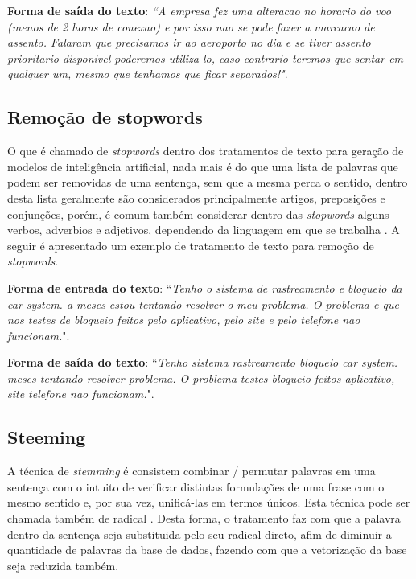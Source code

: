 \documentclass[12pt]{article}
\begin{document}
\textbf{Forma de saída do texto}: \emph{``A empresa fez uma alteracao no horario do voo (menos de 2 horas de conexao) e por isso nao se pode fazer a marcacao de assento. Falaram que precisamos ir ao aeroporto no dia e se tiver assento prioritario disponivel poderemos utiliza-lo, caso contrario teremos que sentar em qualquer um, mesmo que tenhamos que ficar separados!"}.

\subsection{Remoção de stopwords}\label{sec:stopwords}

O que é chamado de \emph{stopwords} dentro dos tratamentos de texto para geração de modelos de inteligência artificial, nada mais é do que uma lista de palavras que podem ser removidas de uma sentença, sem que a mesma perca o sentido, dentro desta lista geralmente são considerados principalmente artigos, preposições e conjunções, porém, é comum também considerar dentro das \emph{stopwords} alguns verbos, adverbios e adjetivos, dependendo da linguagem em que se trabalha \cite{mendez:06}. A seguir é apresentado um exemplo de tratamento de texto para remoção de \textit{stopwords}.

\textbf{Forma de entrada do texto}: ``\emph{Tenho o sistema de rastreamento e bloqueio da car system. a meses estou tentando resolver o meu problema. O problema e que nos testes de bloqueio feitos pelo aplicativo, pelo site e pelo telefone nao funcionam.}". 

\textbf{Forma de saída do texto}: ``\emph{Tenho sistema rastreamento bloqueio car system. meses tentando resolver problema. O problema testes bloqueio feitos aplicativo, site telefone nao funcionam.}".

\subsection{Steeming}\label{sec:steeming}

A técnica de \emph{stemming} é consistem combinar / permutar palavras em uma sentença com o intuito de verificar distintas formulações de uma frase com o mesmo sentido e, por sua vez, unificá-las em termos únicos. Esta técnica pode ser chamada também de radical \cite{dias:06}. Desta forma, o tratamento faz com que a palavra dentro da sentença seja substituida pelo seu radical direto, afim de diminuir a quantidade de palavras da base de dados, fazendo com que a vetorização da base seja reduzida também. 
\end{document}
